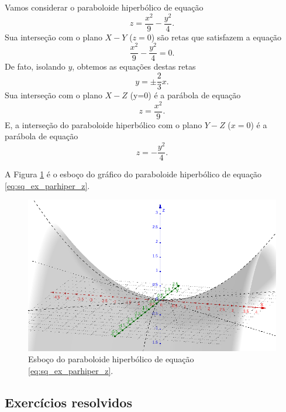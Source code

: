 \begin{ex}
  Vamos considerar o paraboloide hiperbólico de equação
  \begin{equation}\label{eq:sq_ex_parhiper_z}
    z=\frac{x^2}{9}-\frac{y^2}{4}.
  \end{equation}
  Sua interseção com o plano $X-Y$ ($z=0$) são retas que satisfazem a equação
  \begin{equation}
    \frac{x^2}{9}-\frac{y^2}{4}=0.
  \end{equation}
  De fato, isolando $y$, obtemos as equações destas retas
  \begin{equation}
    y = \pm \frac{2}{3}x.
  \end{equation}
  Sua interseção com o plano $X-Z$ (y=0) é a parábola de equação
  \begin{equation}
    z=\frac{x^2}{9}.
  \end{equation}
  E, a interseção do paraboloide hiperbólico com o plano $Y-Z$ ($x=0$) é a parábola de equação
  \begin{equation}
    z=-\frac{y^2}{4}.
  \end{equation}
  
  A Figura \ref{fig:sq_ex_parhiper_z} é o esboço do gráfico do paraboloide hiperbólico de equação \eqref{eq:sq_ex_parhiper_z}.

    \begin{figure}[H]
    \centering
    \includegraphics[width=\textwidth]{./cap_superquad/dados/fig_sq_ex_parhiper_z/fig}
    \caption{Esboço do paraboloide hiperbólico de equação \eqref{eq:sq_ex_parhiper_z}.}
    \label{fig:sq_ex_parhiper_z}
  \end{figure}
\end{ex}

\subsection*{Exercícios resolvidos}

